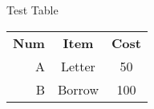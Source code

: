 Test Table

\begin{tabular}{ r c c }
    \textbf{Num} & \textbf{Item} & \textbf{Cost}  \\ 
    A & Letter & 50 \\
    B & Borrow & 100 \\
\end{tabular}